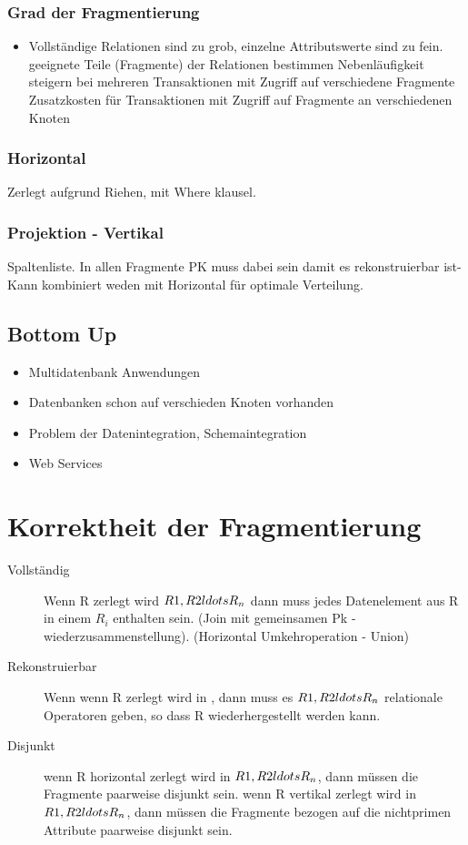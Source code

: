\documentclass[a4paper,10pt,titlepage=false]{scrreprt}
\begin{document}
\subsubsection{Grad der Fragmentierung}
\begin{itemize}
\item Vollständige Relationen sind zu grob, einzelne
Attributswerte sind zu fein.
\subitem geeignete Teile (Fragmente) der Relationen
bestimmen
\subitem Nebenläufigkeit steigern bei mehreren Transaktionen
mit Zugriff auf verschiedene Fragmente
\subitem Zusatzkosten für Transaktionen mit Zugriff auf
Fragmente an verschiedenen Knoten
\end{itemize}

\subsubsection{Horizontal}
Zerlegt aufgrund Riehen, mit Where klausel.
\subsubsection{Projektion - Vertikal}
Spaltenliste. In allen Fragmente PK muss dabei sein damit es rekonstruierbar ist-
Kann kombiniert weden mit Horizontal für optimale Verteilung.

\subsection{Bottom Up}
\begin{itemize}
 \item Multidatenbank Anwendungen
\item Datenbanken schon auf verschieden Knoten vorhanden
\item Problem der Datenintegration, Schemaintegration
\item Web Services
\end{itemize}

\section{Korrektheit der Fragmentierung}
\begin{description}
 \item [Vollständig] Wenn R zerlegt wird $R1,R2 \\ldots R_n$ dann muss jedes Datenelement aus R in einem $R_i$ 
enthalten sein. (Join mit gemeinsamen Pk - wiederzusammenstellung). (Horizontal Umkehroperation - Union)%
\item [Rekonstruierbar] Wenn wenn R zerlegt wird in , dann muss es $R1,R2 \\ldots R_n$
relationale Operatoren geben, so dass R wiederhergestellt
werden kann.
\item[Disjunkt] wenn R horizontal zerlegt wird in $R1,R2 \\ldots R_n$, dann
müssen die Fragmente paarweise disjunkt sein.
wenn R vertikal zerlegt wird in $R1,R2 \\ldots R_n$, dann müssen
die Fragmente bezogen auf die nichtprimen Attribute
paarweise disjunkt sein.
\end{description}
\end{document}
